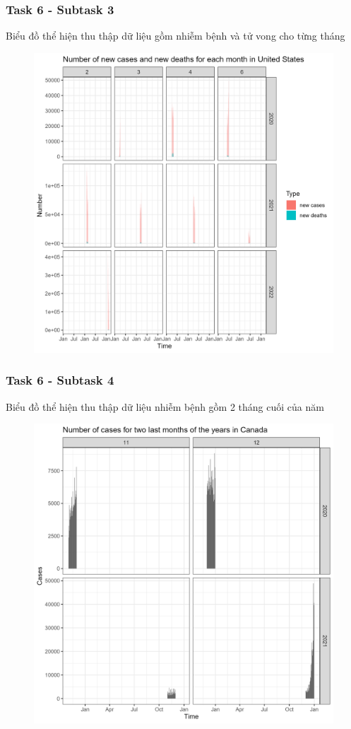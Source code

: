 \documentclass[english,10pt,table]{beamer}
\begin{document}
\frame
{
    \frametitle{Task 6 - Subtask 3}
    \begin{block}{Biểu đồ thể hiện thu thập dữ liệu gồm nhiễm bệnh và tử vong cho từng tháng}
    \begin{figure}[H]
		\centering
		\includegraphics[scale=0.105]{images/6.3.3.png}
	\end{figure}
    \end{block}
}
\frame
{
    \frametitle{Task 6 - Subtask 4}
    \begin{block}{Biểu đồ thể hiện thu thập dữ liệu nhiễm bệnh gồm 2 tháng cuối của năm}
    \begin{figure}[H]
		\centering
		\includegraphics[scale=0.105]{images/6.4.1.png}
	\end{figure}
    \end{block}
}
\end{document}
